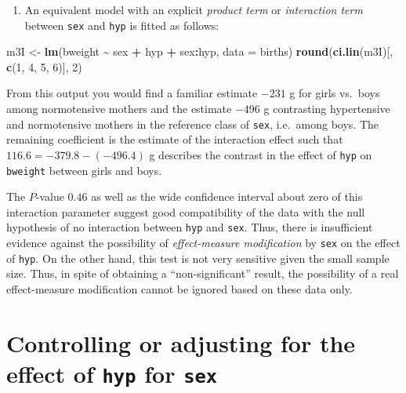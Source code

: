 \documentclass[
]{book}
\newenvironment{Shaded}{\begin{snugshade}}{\end{snugshade}}
\newcommand{\AttributeTok}[1]{\textcolor[rgb]{0.13,0.29,0.53}{#1}}
\newcommand{\DecValTok}[1]{\textcolor[rgb]{0.00,0.00,0.81}{#1}}
\newcommand{\FunctionTok}[1]{\textcolor[rgb]{0.13,0.29,0.53}{\textbf{#1}}}
\newcommand{\NormalTok}[1]{#1}
\newcommand{\OtherTok}[1]{\textcolor[rgb]{0.56,0.35,0.01}{#1}}
\newcommand{\SpecialCharTok}[1]{\textcolor[rgb]{0.81,0.36,0.00}{\textbf{#1}}}
\providecommand{\tightlist}{%
  \setlength{\itemsep}{0pt}\setlength{\parskip}{0pt}}
\begin{document}
\begin{enumerate}
\def\labelenumi{\arabic{enumi}.}
\setcounter{enumi}{2}
\tightlist
\item
  An equivalent model with an explicit \emph{product term} or
  \emph{interaction term} between \texttt{sex} and \texttt{hyp} is
  fitted as follows:
\end{enumerate}

\begin{Shaded}
\begin{Highlighting}[]
\NormalTok{m3I }\OtherTok{\textless{}{-}} \FunctionTok{lm}\NormalTok{(bweight }\SpecialCharTok{\textasciitilde{}}\NormalTok{ sex }\SpecialCharTok{+}\NormalTok{ hyp }\SpecialCharTok{+}\NormalTok{ sex}\SpecialCharTok{:}\NormalTok{hyp, }\AttributeTok{data =}\NormalTok{ births)}
\FunctionTok{round}\NormalTok{(}\FunctionTok{ci.lin}\NormalTok{(m3I)[, }\FunctionTok{c}\NormalTok{(}\DecValTok{1}\NormalTok{, }\DecValTok{4}\NormalTok{, }\DecValTok{5}\NormalTok{, }\DecValTok{6}\NormalTok{)], }\DecValTok{2}\NormalTok{)}
\end{Highlighting}
\end{Shaded}

From this output you would find a familiar estimate \(-231\) g for girls
vs.~boys among normotensive mothers and the estimate \(-496\) g
contrasting hypertensive and normotensive mothers in the
reference class of \texttt{sex}, i.e.~among boys.
The remaining coefficient is the estimate of the interaction
effect such that \(116.6 = -379.8 -(-496.4)\) g
describes the contrast in the effect of \texttt{hyp} on \texttt{bweight}
between girls and boys.

The \(P\)-value \(0.46\) as well
as the wide confidence interval about zero of this interaction
parameter suggest good compatibility of the data with
the null hypothesis of
no interaction between \texttt{hyp} and \texttt{sex}. Thus,
there is insufficient evidence against
the possibility of \emph{effect-measure modification} by
\texttt{sex} on the effect of \texttt{hyp}.
On the other hand, this test is not very sensitive given
the small sample size. Thus, in spite of obtaining a ``non-significant''
result, the possibility of a real effect-measure modification
cannot be ignored based on these data only.

\section{\texorpdfstring{Controlling or adjusting for the effect of \texttt{hyp} for \texttt{sex}}{Controlling or adjusting for the effect of hyp for sex}}\label{controlling-or-adjusting-for-the-effect-of-hyp-for-sex}
\end{document}
